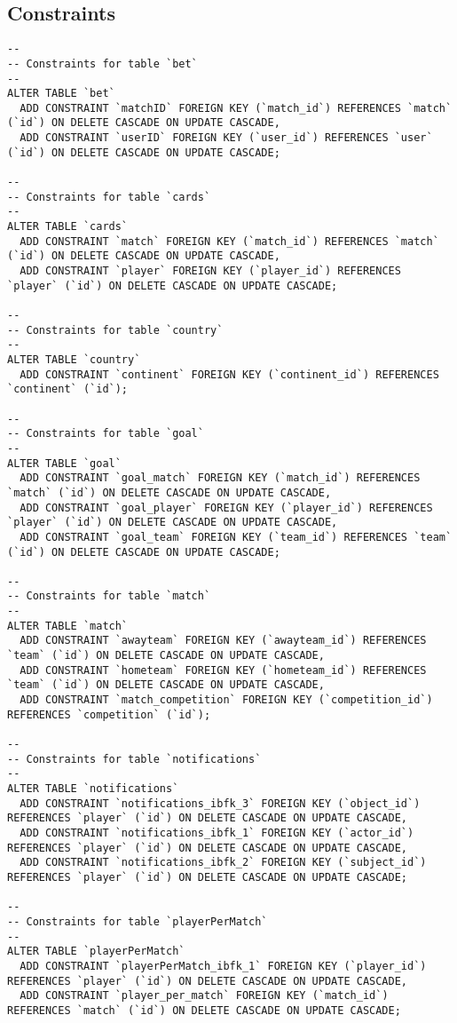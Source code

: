 \documentclass[11pt, a4paper]{article}
\begin{document}
\subsection{Constraints}
\begin{lstlisting}
--
-- Constraints for table `bet`
--
ALTER TABLE `bet`
  ADD CONSTRAINT `matchID` FOREIGN KEY (`match_id`) REFERENCES `match` (`id`) ON DELETE CASCADE ON UPDATE CASCADE,
  ADD CONSTRAINT `userID` FOREIGN KEY (`user_id`) REFERENCES `user` (`id`) ON DELETE CASCADE ON UPDATE CASCADE;

--
-- Constraints for table `cards`
--
ALTER TABLE `cards`
  ADD CONSTRAINT `match` FOREIGN KEY (`match_id`) REFERENCES `match` (`id`) ON DELETE CASCADE ON UPDATE CASCADE,
  ADD CONSTRAINT `player` FOREIGN KEY (`player_id`) REFERENCES `player` (`id`) ON DELETE CASCADE ON UPDATE CASCADE;

--
-- Constraints for table `country`
--
ALTER TABLE `country`
  ADD CONSTRAINT `continent` FOREIGN KEY (`continent_id`) REFERENCES `continent` (`id`);

--
-- Constraints for table `goal`
--
ALTER TABLE `goal`
  ADD CONSTRAINT `goal_match` FOREIGN KEY (`match_id`) REFERENCES `match` (`id`) ON DELETE CASCADE ON UPDATE CASCADE,
  ADD CONSTRAINT `goal_player` FOREIGN KEY (`player_id`) REFERENCES `player` (`id`) ON DELETE CASCADE ON UPDATE CASCADE,
  ADD CONSTRAINT `goal_team` FOREIGN KEY (`team_id`) REFERENCES `team` (`id`) ON DELETE CASCADE ON UPDATE CASCADE;

--
-- Constraints for table `match`
--
ALTER TABLE `match`
  ADD CONSTRAINT `awayteam` FOREIGN KEY (`awayteam_id`) REFERENCES `team` (`id`) ON DELETE CASCADE ON UPDATE CASCADE,
  ADD CONSTRAINT `hometeam` FOREIGN KEY (`hometeam_id`) REFERENCES `team` (`id`) ON DELETE CASCADE ON UPDATE CASCADE,
  ADD CONSTRAINT `match_competition` FOREIGN KEY (`competition_id`) REFERENCES `competition` (`id`);

--
-- Constraints for table `notifications`
--
ALTER TABLE `notifications`
  ADD CONSTRAINT `notifications_ibfk_3` FOREIGN KEY (`object_id`) REFERENCES `player` (`id`) ON DELETE CASCADE ON UPDATE CASCADE,
  ADD CONSTRAINT `notifications_ibfk_1` FOREIGN KEY (`actor_id`) REFERENCES `player` (`id`) ON DELETE CASCADE ON UPDATE CASCADE,
  ADD CONSTRAINT `notifications_ibfk_2` FOREIGN KEY (`subject_id`) REFERENCES `player` (`id`) ON DELETE CASCADE ON UPDATE CASCADE;

--
-- Constraints for table `playerPerMatch`
--
ALTER TABLE `playerPerMatch`
  ADD CONSTRAINT `playerPerMatch_ibfk_1` FOREIGN KEY (`player_id`) REFERENCES `player` (`id`) ON DELETE CASCADE ON UPDATE CASCADE,
  ADD CONSTRAINT `player_per_match` FOREIGN KEY (`match_id`) REFERENCES `match` (`id`) ON DELETE CASCADE ON UPDATE CASCADE;


\end{lstlisting}
\end{document}
